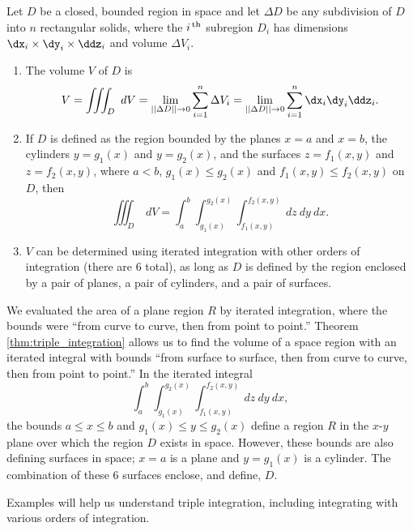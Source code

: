 \noindent\hskip-100pt\begin{minipage}{\linewidth}
{Let $D$ be a closed, bounded region in space and let $\Delta D$ be any subdivision of $D$ into $n$ rectangular solids, where the  $i^\text{\,th}$ subregion $D_i$ has dimensions $\dx_i\times\dy_i\times\ddz_i$ and volume $\Delta V_i$.
\begin{enumerate}
	\item The volume $V$ of $D$ is
	$$V = \iiint_D\ dV = \lim_{||\Delta D||\to0} \sum_{i=1}^n \Delta V_i = \lim_{||\Delta D||\to0} \sum_{i=1}^n \dx_i\dy_i\ddz_i.$$
	
	\item		If $D$ is defined as the region bounded by the planes $x=a$ and $x=b$, the cylinders $y=g_1(x)$ and $y=g_2(x)$, and the surfaces $z=f_1(x,y)$ and $z=f_2(x,y)$, where $a<b$, $g_1(x)\leq g_2(x)$ and $f_1(x,y)\leq f_2(x,y)$ on $D$, then
	$$\iiint_D \ dV = \int_a^b\int_{g_1(x)}^{g_2(x)}\int_{f_1(x,y)}^{f_2(x,y)} \ dz\ dy\ dx.$$
	
	\item		$V$ can be determined using iterated integration with other orders of integration (there are 6 total), as long as $D$ is defined by the region enclosed by a pair of planes, a pair of cylinders, and a pair of surfaces.
\end{enumerate}
}
\end{minipage}
\restoreboxwidth

We evaluated the area of a plane region $R$ by iterated integration, where the bounds were ``from curve to curve, then from point to point.'' Theorem \ref{thm:triple_integration} allows us to find the volume of a space region with an iterated integral with bounds ``from surface to surface, then from curve to curve, then from point to point.'' In the iterated integral 
$$\int_a^b\int_{g_1(x)}^{g_2(x)}\int_{f_1(x,y)}^{f_2(x,y)} \ dz\ dy\ dx,$$
the bounds $a\leq x\leq b$ and $g_1(x)\leq y\leq g_2(x)$ define a region $R$ in the $x$-$y$ plane over which the region $D$ exists in space. However, these bounds are also defining surfaces in space; $x=a$ is a plane and $y=g_1(x)$ is a cylinder. The combination of these 6 surfaces enclose, and define, $D$.

Examples will help us understand triple integration, including integrating with various orders of integration.\\

